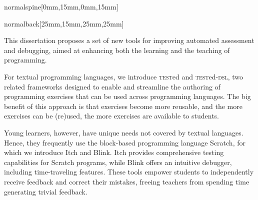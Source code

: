 \documentclass[coverheight=240mm,coverwidth=170mm,spinewidth=15mm,trimmed,bleedwidth=0cm,marklength=0cm]{bookcover}
\begin{document}
\begin{bookcover}
    \begin{bookcoverelement}{normal}{spine}[0mm,15mm,0mm,15mm]%
        \centering
        \hspace*{0.1cm}
         \par
        \vspace*{\fill}
    \end{bookcoverelement}
    \begin{bookcoverelement}{normal}{back}[25mm,15mm,25mm,25mm]
        \fontsize{11pt}{15pt}\selectfont{}\setlength{\parskip}{3mm}

        This dissertation proposes a set of new tools for improving automated assessment and debugging, aimed at enhancing both the learning and the teaching of programming.

        For textual programming languages, we introduce \textsc{test}ed and \textsc{test}ed-\textsc{dsl}, two related frameworks designed to enable and streamline the authoring of programming exercises that can be used across programming languages.
        The big benefit of this approach is that exercises become more reusable, and the more exercises can be (re)used, the more exercises are available to students.

        Young learners, however, have unique needs not covered by textual languages.
        Hence, they frequently use the block-based programming language Scratch, for which we introduce Itch and Blink.
        Itch provides comprehensive testing capabilities for Scratch programs, while Blink offers an intuitive debugger, including time-traveling features.
        These tools empower students to independently receive feedback and correct their mistakes, freeing teachers from spending time generating trivial feedback.

        \vspace*{\fill}%
        \begin{center}%
        \end{center}
    \end{bookcoverelement}
\end{bookcover}
\end{document}
